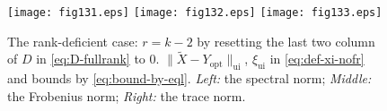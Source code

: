 \documentclass[11pt]{article}
\def\cX{{\cal X}}
\DeclareMathOperator*{\opt}{opt}
\DeclareMathOperator{\tr}{tr}
\DeclareMathOperator{\F}{F}
\DeclareMathOperator{\UI}{ui}
\def\wtd{\widetilde}
\theoremstyle{definition}
\numberwithin{equation}{section}
\numberwithin{figure}{section}
\numberwithin{table}{section}
\begin{document}
\begin{figure}
\begin{center}
\texttt{[image: fig131.eps]}
\texttt{[image: fig132.eps]}
\texttt{[image: fig133.eps]}
\end{center}
\vspace{-10pt}
\caption{The rank-deficient case: $r=k-2$ by resetting the last two column of $D$ in \eqref{eq:D-fullrank} to $0$.
$\|\wtd X-Y_{\opt}\|_{\UI}$,  $\xi_{\UI}$ in \eqref{eq:def-xi-nofr} and bounds by \eqref{eq:bound-by-eql}.
         {\em Left:\/} the spectral norm; {\em Middle:\/} the Frobenius norm;
         {\em Right:\/} the trace norm.
}
\label{fig13}
\end{figure}
\end{document}
